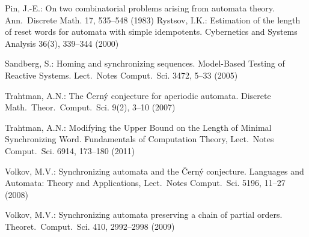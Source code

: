 \documentclass[11pt]{llncs}
\begin{document}
\begin{thebibliography}{99}
Pin, J.-E.: On two combinatorial problems arising from automata
theory. Ann.\ Discrete Math. 17, 535--548 (1983)
%
Rystsov, I.K.: Estimation of the length of reset words for automata with simple idempotents. 
Cybernetics and Systems Analysis 36(3), 339--344 (2000)


Sandberg, S.: Homing and synchronizing sequences. 
Model-Based Testing of Reactive Systems. Lect.\ Notes Comput.\ Sci. 3472, 5--33 (2005)
%
%
%

Trahtman, A.N.: The \v{C}ern\'y conjecture for aperiodic automata.
Discrete Math.\ Theor.\ Comput.\ Sci. 9(2), 3--10 (2007)

Trahtman, A.N.: Modifying the Upper Bound on the Length of Minimal Synchronizing Word.
Fundamentals of Computation Theory, Lect.\ Notes Comput.\ Sci. 6914, 173--180 (2011)

%

Volkov, M.V.: Synchronizing automata and the \v{C}ern\'{y}
conjecture. 
Languages and Automata: Theory and Applications, Lect.\ Notes
Comput.\ Sci. 5196, 11--27 (2008)

Volkov, M.V.: Synchronizing automata preserving a chain of partial
orders. Theoret.\ Comput.\ Sci. 410, 2992--2998 (2009)
\end{thebibliography}
\end{document}
